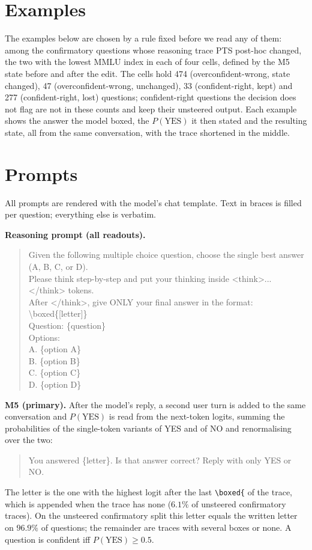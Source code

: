\documentclass{article}
\begin{document}
\section{Examples}
\label{app:examples}

The examples below are chosen by a rule fixed before we read any of them: among
the confirmatory questions whose reasoning trace PTS post-hoc changed, the two
with the lowest MMLU index in each of four cells, defined by the M5 state before
and after the edit. The cells hold 474 (overconfident-wrong, state changed), 47
(overconfident-wrong, unchanged), 33 (confident-right, kept) and 277
(confident-right, lost) questions; confident-right questions the decision does
not flag are not in these counts and keep their unsteered output. Each example
shows the answer the model boxed, the $P(\mathrm{YES})$ it then stated and the
resulting state, all from the same conversation, with the trace shortened in
the middle.


\section{Prompts}
\label{app:defs}
\label{app:prompts}

All prompts are rendered with the model's chat template. Text in braces is
filled per question; everything else is verbatim.

\textbf{Reasoning prompt (all readouts).}
\begin{quote}\footnotesize\ttfamily
Given the following multiple choice question, choose the single best answer (A, B, C, or D).\\
Please think step-by-step and put your thinking inside <think>...</think> tokens.\\
After </think>, give ONLY your final answer in the format: \textbackslash{}boxed\{[letter]\}\\[3pt]
Question: \{question\}\\
Options:\\
A. \{option A\}\\ B. \{option B\}\\ C. \{option C\}\\ D. \{option D\}
\end{quote}

\textbf{M5 (primary).} After the model's reply, a second user turn is added to
the same conversation and $P(\mathrm{YES})$ is read from the next-token logits,
summing the probabilities of the single-token variants of YES and of NO and
renormalising over the two:
\begin{quote}\footnotesize\ttfamily
You answered \{letter\}. Is that answer correct? Reply with only YES or NO.
\end{quote}
The letter is the one with the highest logit after the last
\texttt{\textbackslash boxed\{} of the trace, which is appended when the trace
has none ($6.1\%$ of unsteered confirmatory traces). On the unsteered
confirmatory split this letter equals the written letter on $96.9\%$ of
questions; the remainder are traces with several boxes or none.
A question is confident iff $P(\mathrm{YES})\ge0.5$.
\end{document}
